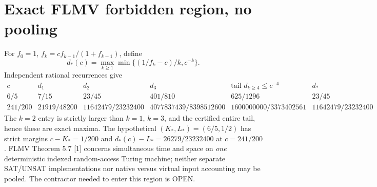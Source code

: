 \documentclass[11pt]{article}
\begin{document}
\section{Exact FLMV forbidden region, no pooling}
For $f_0=1$, $f_k=cf_{k-1}/(1+f_{k-1})$, define
\[
 d_*(c)=\max_{k\ge1}\min\{(1/f_k-c)/k,c^{-k}\}.
\]
Independent rational recurrences give
\[
\begin{array}{c|ccc|c|c}
c&d_1&d_2&d_3&\text{tail }d_{k\ge4}\le c^{-4}&d_*\\\hline
6/5&7/15&23/45&401/810&625/1296&23/45\\
241/200&21919/48200&11642479/23232400&4077837439/8398512600&
1600000000/3373402561&11642479/23232400
\end{array}
\]
The $k=2$ entry is strictly larger than $k=1$, $k=3$, and the certified entire tail, hence these are exact maxima. The hypothetical $(K_*,L_*)=(6/5,1/2)$ has strict margins
$c-K_*=1/200$ and $d_*(c)-L_*=26279/23232400$ at $c=241/200$. FLMV Theorem 5.7 [1] concerns simultaneous time and space on \emph{one} deterministic indexed random-access Turing machine; neither separate SAT/UNSAT implementations nor native versus virtual input accounting may be pooled. The contractor needed to enter this region is OPEN.
\end{document}
